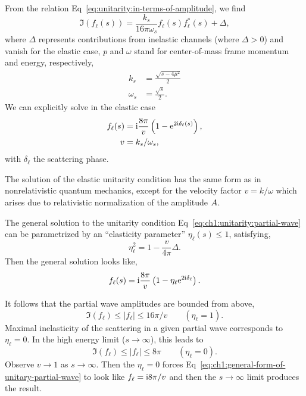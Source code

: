 \M[-1] From the relation Eq~\eqref{eq:unitarity:in-terms-of-amplitude},
we find
\begin{equation}\label{eq:ch1:unitarity:partial-wave}
\Im(f_{\ell}(s)) = \frac{k_{s}}{16\pi\omega_{s}} f_{\ell}(s)f^{*}_{\ell}(s) + \Delta,
\end{equation}
where $\Delta$ represents contributions from inelastic channels (where
$\Delta>0$) and vanish for the elastic case, $p$ and $\omega$ stand for
center-of-mass frame momentum and energy, respectively,
\begin{subequations}
  \begin{align}
    k_{s} &= \frac{\sqrt{s-4\mu^{2}}}{2}\\
    \omega_{s} &= \frac{\sqrt{s}}{2}.
  \end{align}
\end{subequations}
We can explicitly solve in the elastic case
\begin{subequations}
  \begin{align}
    f_{\ell}(s)&=\mathrm{i}\frac{8\pi}{v}\left(1 - \mathrm{e}^{2\mathrm{i}\delta_{\ell}(s)}\right),\\
    v &= k_{s}/\omega_{s},
  \end{align}
\end{subequations}
with $\delta_{\ell}$ the scattering phase.

The solution of the elastic unitarity condition has the same form as in
nonrelativistic quantum mechanics, except for the velocity factor
$v=k/\omega$ which arises due to relativistic normalization of the
amplitude $A$.

The general solution to the unitarity condition
Eq~\eqref{eq:ch1:unitarity:partial-wave} can be parametrized by an
``elasticity parameter'' $\eta_{\ell}(s)\leq 1$, satisfying,
\begin{equation}
\eta_{\ell}^{2} = 1 - \frac{v}{4\pi}\Delta.
\end{equation}
Then the general solution looks like,
\begin{equation}\label{eq:ch1:general-form-of-unitary-partial-wave}
f_{\ell}(s) = \mathrm{i}\frac{8\pi}{v}\left(1 - \eta_{\ell}\mathrm{e}^{2\mathrm{i}\delta_{\ell}}\right).
\end{equation}

It follows that the partial wave amplitudes are bounded from above,
\begin{equation}
\Im(f_{\ell})\leq|f_{\ell}|\leq 16\pi/v\qquad(\eta_{\ell}=1).
\end{equation}
Maximal inelasticity of the scattering in a given partial wave
corresponds to $\eta_{\ell}=0$. In the high energy limit ($s\to\infty$),
this leads to
\begin{equation}
\Im(f_{\ell})\leq|f_{\ell}|\leq 8\pi\qquad(\eta_{\ell}=0).
\end{equation}
Observe $v\to1$ as $s\to\infty$. Then the $\eta_{\ell}=0$ forces Eq~\eqref{eq:ch1:general-form-of-unitary-partial-wave}
to look like $f_{\ell} = \mathrm{i} 8\pi/v$ and then the $s\to\infty$ limit
produces the result.

